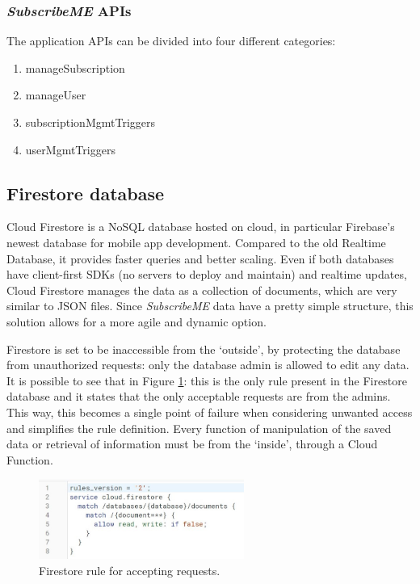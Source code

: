 \documentclass[11pt]{article}
\begin{document}
\subsubsection{\textit{SubscribeME} APIs}
The application APIs can be divided into four different categories: \begin{enumerate}
    \item manageSubscription
    \item manageUser
    \item subscriptionMgmtTriggers
    \item userMgmtTriggers
\end{enumerate}

\subsection{Firestore database}
Cloud Firestore is a NoSQL database hosted on cloud, in particular Firebase's newest database for mobile app development. Compared to the old Realtime Database, it provides faster queries and better scaling. Even if both databases have client-first SDKs (no servers to deploy and maintain) and realtime updates, Cloud Firestore manages the data as a collection of documents, which are very similar to JSON files. Since \textit{SubscribeME} data have a pretty simple structure, this solution allows for a more agile and dynamic option.

Firestore is set to be inaccessible from the `outside', by protecting the database from unauthorized requests: only the database admin is allowed to edit any data. It is possible to see that in Figure \ref{fig:rule}: this is the only rule present in the Firestore database and it states that the only acceptable requests are from the admins. This way, this becomes a single point of failure when considering unwanted access and simplifies the rule definition. Every function of manipulation of the saved data or retrieval of information must be from the `inside', through a Cloud Function.

\begin{figure}[h!]
    \begin{center}
        \includegraphics[width=0.6\textwidth, clip]{../../assets/firestoreRule.jpg}
    \end{center}
    \caption{Firestore rule for accepting requests.}
    \label{fig:rule}
\end{figure}
\end{document}
